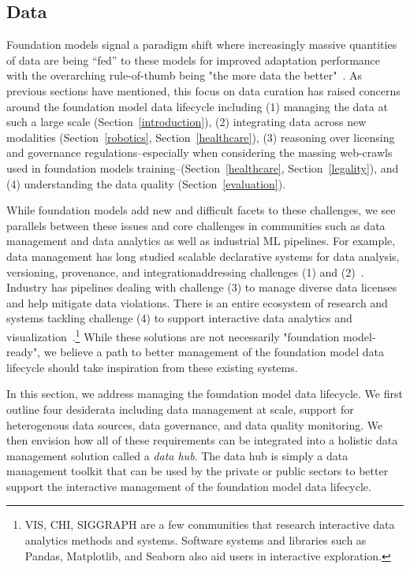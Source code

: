\subsection{Data}
\label{sec:data}

Foundation models signal a paradigm shift where increasingly massive quantities of data are being ``fed'' to these models for improved adaptation performance~\citep{devlin2019bert,radford2021learning,tolstikhin2021mlpmixer} with the overarching rule-of-thumb being "the more data the better"~\citep{kaplan2020}. As previous sections have mentioned, this focus on data curation has raised concerns around the foundation model data lifecycle including (1) managing the data at such a large scale (Section~\ref{introduction}), (2) integrating data across new modalities (Section~\ref{robotics}, Section~\ref{healthcare}), (3) reasoning over licensing and governance regulations--especially when considering the massing web-crawls used in foundation models training--(Section~\ref{healthcare}, Section~\ref{legality}), and (4) understanding the data quality (Section~\ref{evaluation}).

While foundation models add new and difficult facets to these challenges, we see parallels between these issues and core challenges in communities such as data management and data analytics as well as industrial ML pipelines. For example, data management has long studied scalable declarative systems for data analysis, versioning, provenance, and integration\textemdash addressing challenges (1) and (2)~\citep{zaharia2012resilient, cudre2009demonstration, stonebraker2013voltdb, Stonebraker2018dataintegration, hellerstein2005readings}. Industry has pipelines dealing with challenge (3) to manage diverse data licenses and help mitigate data violations. There is an entire ecosystem of research and systems tackling challenge (4) to support interactive data analytics and visualization~\citep{hohman2020understanding}.\footnote{VIS, CHI, SIGGRAPH are a few communities that research interactive data analytics methods and systems. Software systems and libraries such as Pandas, Matplotlib, and Seaborn also aid users in interactive exploration.} While these solutions are not necessarily "foundation model-ready", we believe a path to better management of the foundation model data lifecycle should take inspiration from these existing systems.

In this section, we address managing the foundation model data lifecycle. We first outline four desiderata including data management at scale, support for heterogenous data sources, data governance, and data quality monitoring. We then envision how all of these requirements can be integrated into a holistic data management solution called a {\em data hub}. The data hub is simply a data management toolkit that can be used by the private or public sectors to better support the interactive management of the foundation model data lifecycle.


